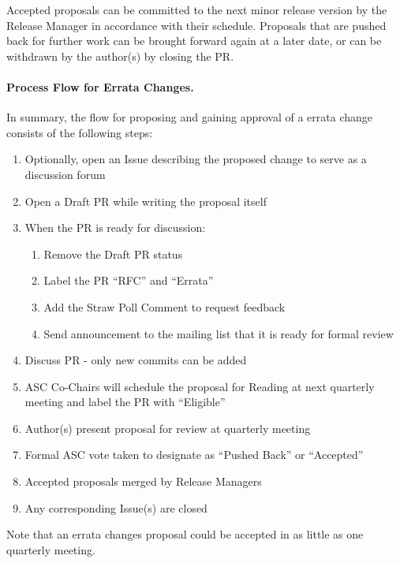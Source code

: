\documentclass{article}
\providecommand{\tightlist}{%
  \setlength{\itemsep}{0pt}\setlength{\parskip}{0pt}}
\begin{document}
Accepted proposals can be committed to the next minor release version by
the Release Manager in accordance with their schedule.
Proposals that are pushed back for further work can be brought forward
again at a later date, or can be withdrawn by the author(s) by
closing the PR.

\hypertarget{process-flow-for-errata-changes}{%
\paragraph{Process Flow for Errata Changes.}%
\label{process-flow-for-errata-changes}}

In summary, the flow for proposing and gaining approval of a errata change consists of the following steps:

\begin{enumerate}
\def\labelenumi{\arabic{enumi}.}
\tightlist
\item
  Optionally, open an Issue describing the proposed change to serve as a discussion
  forum
\item
  Open a Draft PR while writing the proposal itself
\item
  When the PR is ready for discussion:
  \begin{enumerate}
  \def\labelenumi{\arabic{enumi}.}
  \tightlist
  \item 
    Remove the Draft PR status
  \item
    Label the PR ``RFC'' and ``Errata''
  \item
    Add the Straw Poll Comment to request feedback
  \item
    Send announcement to the mailing list that it is ready for formal review
  \end{enumerate}
\item
  Discuss PR - only new commits can be added
\item
  ASC Co-Chairs will schedule the proposal for Reading at next quarterly
  meeting and label the PR with ``Eligible''
\item
  Author(s) present proposal for review at quarterly meeting
\item
  Formal ASC vote taken to designate as ``Pushed Back'' or ``Accepted''
\item
  Accepted proposals merged by Release Managers
\item
  Any corresponding Issue(s) are closed
\end{enumerate}

Note that an errata changes proposal could be accepted in as little as one quarterly
meeting.
\end{document}
